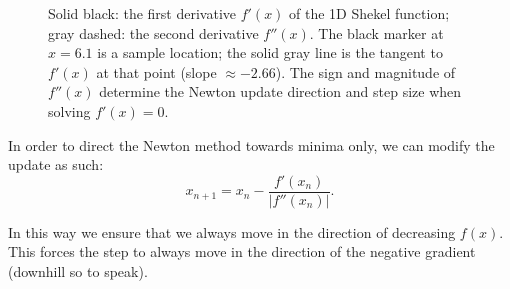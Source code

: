 \vspace{1.5em}
\begin{figure}[h]
    \centering
    \caption{Solid black: the first derivative $f'(x)$ of the 1D Shekel function; gray dashed: the second derivative $f''(x)$. The black marker at $x=6.1$ is a sample location; the solid gray line is the tangent to $f'(x)$ at that point (slope $\approx-2.66$). The sign and magnitude of $f''(x)$ determine the Newton update direction and step size when solving $f'(x)=0$.}
    \label{fig:shekel_foxholes_derivatives_minima}
\end{figure}

In order to direct the Newton method towards minima only, we can modify the update as such:
\begin{equation}
    x_{n+1} = x_n - \frac{f'(x_n)}{|f''(x_n)|}.
\end{equation}

In this way we ensure that we always move in the direction of decreasing $f(x)$. 
This forces the step to always move in the direction of the negative gradient (downhill so to speak).

